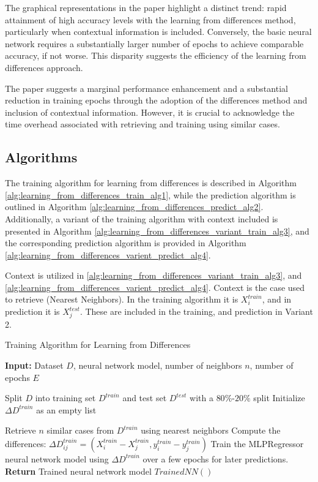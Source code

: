 \documentclass[a4paper, 12pt]{report}
\begin{document}
The graphical representations in the paper highlight a distinct trend: rapid attainment of high accuracy levels with the learning from differences method,
particularly when contextual information is included. Conversely, the basic neural network requires a substantially larger number of epochs to achieve comparable accuracy, if not worse.
This disparity suggests the efficiency of the learning from differences approach.

The paper suggests a marginal performance enhancement and a substantial reduction in training epochs through the adoption of the differences method and inclusion of contextual information.
However, it is crucial to acknowledge the time overhead associated with retrieving and training using similar cases.

\subsection{Algorithms}

The training algorithm for learning from differences is described in Algorithm \ref{alg:learning_from_differences_train_alg1}, 
while the prediction algorithm is outlined in Algorithm \ref{alg:learning_from_differences_predict_alg2}.
Additionally, a variant of the training algorithm with context included is presented in Algorithm \ref{alg:learning_from_differences_variant_train_alg3}, and the
corresponding prediction algorithm is provided in Algorithm \ref{alg:learning_from_differences_varient_predict_alg4}.

Context is utilized in \ref{alg:learning_from_differences_variant_train_alg3}, and \ref{alg:learning_from_differences_varient_predict_alg4}. 
Context is the case used to retrieve (Nearest Neighbors). In the training algorithm it is $X^{train}_i$, and in prediction it is $X^{test}_j$. 
These are included in the training, and prediction in Variant 2.
\begin{algorithm}
	\caption{Training Algorithm for Learning from Differences}
	\label{alg:learning_from_differences_train_alg1}

	\textbf{Input:} Dataset $D$, neural network model, number of neighbors $n$, number of epochs $E$
	\begin{algorithmic}[1]
        \State Split $D$ into training set $D^{train}$ and test set $D^{test}$ with a $80\%$-$20\%$ split
        \State Initialize $\Delta D^{train}$ as an empty list
        
            \State Retrieve $n$ similar cases from $D^{train}$ using nearest neighbors
                \State Compute the differences: $\Delta D^{train}_{ij} = (X^{train}_i - X^{train}_j, y^{train}_i - y^{train}_j)$
            \EndFor
        \EndFor
        \State Train the MLPRegressor neural network model using $\Delta D^{train}$ over a few epochs for later predictions.
        \State \textbf{Return} Trained neural network model $Trained NN()$
    \end{algorithmic}
\end{algorithm}
\end{document}
